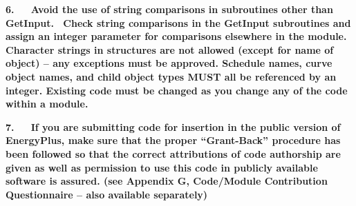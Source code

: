 \textbf{6.~~~Avoid the use of string comparisons in subroutines other than GetInput.~ Check string comparisons in the GetInput subroutines and assign an integer parameter for comparisons elsewhere in the module. Character strings in structures are not allowed (except for name of object) -- any exceptions must be approved. Schedule names, curve object names, and child object types MUST all be referenced by an integer. Existing code must be changed as you change any of the code within a module.~}

\textbf{7.~~~If you are submitting code for insertion in the public version of EnergyPlus, make sure that the proper ``Grant-Back'' procedure has been followed so that the correct attributions of code authorship are given as well as permission to use this code in publicly available software is assured. (see Appendix G, Code/Module Contribution Questionnaire -- also available separately)}
